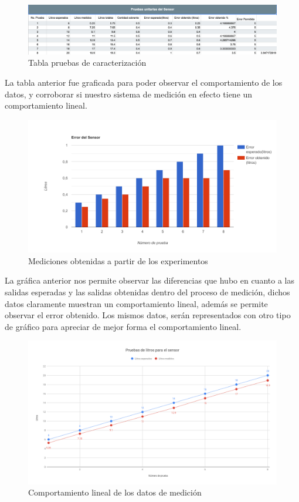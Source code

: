 \begin{figure}[H]
	\centering
	\includegraphics[width=1\textwidth]{Capitulo6/caracterizacion/img/Tabla.png}
	\caption{Tabla pruebas de caracterización}
\end{figure}
La tabla anterior fue graficada para poder observar el comportamiento de los datos, y corroborar si nuestro sistema de medición en efecto tiene un comportamiento lineal.

\begin{figure}[H]
	\centering
	\includegraphics[width=1\textwidth]{Capitulo6/caracterizacion/img/Error_sensor.png}
	\caption{Mediciones obtenidas a partir de los experimentos}
\end{figure}

La gráfica anterior nos permite observar las diferencias que hubo en cuanto a las salidas esperadas y las salidas obtenidas dentro del proceso de medición, dichos datos claramente muestran un comportamiento lineal, además se permite observar el error obtenido. Los mismos datos, serán representados con otro tipo de gráfico para apreciar de mejor forma el comportamiento lineal.

\begin{figure}[H]
	\centering
	\includegraphics[width=1\textwidth]{Capitulo6/caracterizacion/img/Pruebas-de-litros-para-el-sensor}
	\caption{Comportamiento lineal de los datos de medición}
\end{figure}

